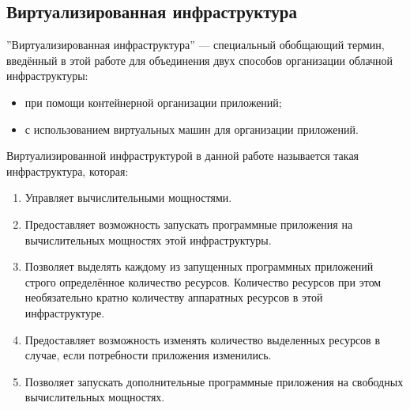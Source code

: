 \subsection{Виртуализированная инфраструктура}
''Виртуализированная инфраструктура'' --- специальный обобщающий термин, введённый в этой работе для объединения двух способов организации облачной инфраструктуры:
\begin{itemize}
    \item при помощи контейнерной организации приложений;
    \item с использованием виртуальных машин для организации приложений.
\end{itemize}
Виртуализированной инфраструктурой в данной работе называется такая инфраструктура, которая:
\begin{enumerate}
    \item Управляет вычислительными мощностями.
    \item Предоставляет возможность запускать программные приложения на вычислительных мощностях этой инфраструктуры.
    \item Позволяет выделять каждому из запущенных программных приложений строго определённое количество ресурсов. 
    Количество ресурсов при этом необязательно кратно количеству аппаратных ресурсов в этой инфраструктуре.
    \item Предоставляет возможность изменять количество выделенных ресурсов в случае, если потребности приложения изменились.
    \item Позволяет запускать дополнительные программные приложения на свободных вычислительных мощностях.
\end{enumerate}
